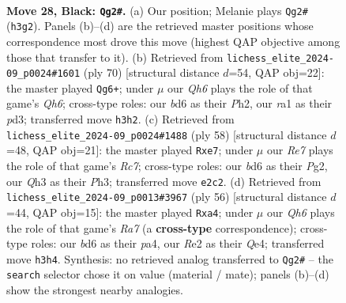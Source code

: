\documentclass[11pt]{article}
\begin{document}
\clearpage

\begin{figure}[p]\centering
\begin{subfigure}{0.46\textwidth}\centering
\resizebox{\linewidth}{!}{%
\newchessgame
\chessboard[
  setfen={6k1/p4p1p/3B2p1/8/3n1P2/P6q/4r3/R3Q1K1 b - - 0 28},
  showmover=false,
  pgfstyle=straightmove, color=movearrow, markmove={h3-g2}
]}
\caption{}
\end{subfigure}\hfill
\begin{subfigure}{0.46\textwidth}\centering
\resizebox{\linewidth}{!}{%
\newchessgame
\chessboard[
  setfen={4r3/3q1k2/4R2Q/2r3p1/8/P2p4/5PPP/6K1 w - - 0 36},
  showmover=false,
  pgfstyle=straightmove, color=movearrow, markmove={h6-g6}
]}
\caption{}
\end{subfigure}
\\[4pt]
\begin{subfigure}{0.46\textwidth}\centering
\resizebox{\linewidth}{!}{%
\newchessgame
\chessboard[
  setfen={5r1k/p1R1q2p/6p1/3N1b2/P7/7P/5PP1/6K1 w - - 0 30},
  showmover=false,
  pgfstyle=straightmove, color=movearrow, markmove={c7-e7}
]}
\caption{}
\end{subfigure}\hfill
\begin{subfigure}{0.46\textwidth}\centering
\resizebox{\linewidth}{!}{%
\newchessgame
\chessboard[
  setfen={1r4k1/R4pp1/7p/8/pq2Q3/6PP/5PK1/8 w - - 4 29},
  showmover=false,
  pgfstyle=straightmove, color=movearrow, markmove={a7-a4}
]}
\caption{}
\end{subfigure}
\caption{\textbf{Move 28, Black: \texttt{Qg2\#}.} (a) Our position; Melanie plays \texttt{Qg2\#} (\texttt{h3g2}). Panels (b)--(d) are the retrieved master positions whose correspondence most drove this move (highest QAP objective among those that transfer to it). (b) Retrieved from \texttt{lichess\_elite\_2024-09\_p0024\#1601} (ply 70) [structural distance $d$=54, QAP obj=22]: the master played \texttt{Qg6+}; under $\mu$ our \emph{Qh6} plays the role of that game's \emph{Qh6}; cross-type roles: our \emph{b}d6 as their \emph{P}h2, our \emph{r}a1 as their \emph{p}d3; transferred move \texttt{h3h2}. (c) Retrieved from \texttt{lichess\_elite\_2024-09\_p0024\#1488} (ply 58) [structural distance $d$=48, QAP obj=21]: the master played \texttt{Rxe7}; under $\mu$ our \emph{Re7} plays the role of that game's \emph{Rc7}; cross-type roles: our \emph{b}d6 as their \emph{P}g2, our \emph{Q}h3 as their \emph{P}h3; transferred move \texttt{e2c2}. (d) Retrieved from \texttt{lichess\_elite\_2024-09\_p0013\#3967} (ply 56) [structural distance $d$=44, QAP obj=15]: the master played \texttt{Rxa4}; under $\mu$ our \emph{Qh6} plays the role of that game's \emph{Ra7} (a \textbf{cross-type} correspondence); cross-type roles: our \emph{b}d6 as their \emph{p}a4, our \emph{R}e2 as their \emph{Q}e4; transferred move \texttt{h3h4}. Synthesis: no retrieved analog transferred to \texttt{Qg2\#} -- the \texttt{search} selector chose it on value (material / mate); panels (b)--(d) show the strongest nearby analogies.}
\label{fig:thought-m55}
\end{figure}
\end{document}
